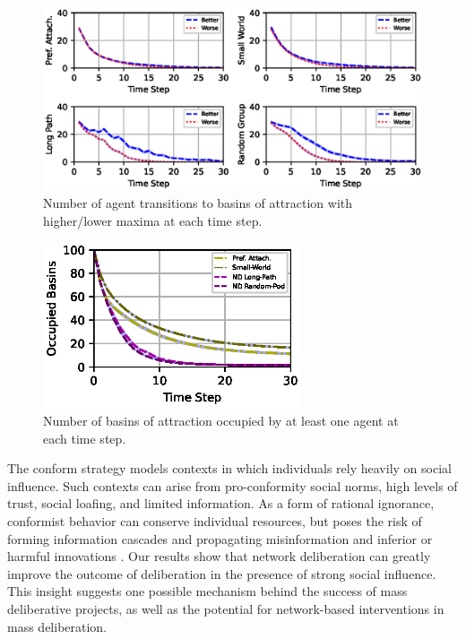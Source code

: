 \begin{figure}
\centering
\includegraphics[width=6in]{chapters/figures/NetDelibABM/fig-conform-transition-basin.eps}
	\caption{Number of agent transitions to basins of attraction with higher/lower maxima at each time step.}
    \label{fig:conform-transition-basin}
\end{figure}

\begin{figure}
\centering
\includegraphics[width=3in]{chapters/figures/NetDelibABM/fig-conform-basin.eps}
	\caption{Number of basins of attraction occupied by at least one agent at each time step.}
    \label{fig:conform-basin}
\end{figure}


The conform strategy models contexts in which individuals rely heavily on social influence. Such contexts can arise from pro-conformity social norms, high levels of trust, social loafing, and limited information. As a form of rational ignorance, conformist behavior can conserve individual resources, but poses the risk of forming information cascades and propagating misinformation and inferior or harmful innovations \cite{banerjee_simple_1992}. Our results show that network deliberation can greatly improve the outcome of deliberation in the presence of strong social influence. This insight suggests one possible mechanism behind the success of mass deliberative projects, as well as the potential for network-based interventions in mass deliberation.

